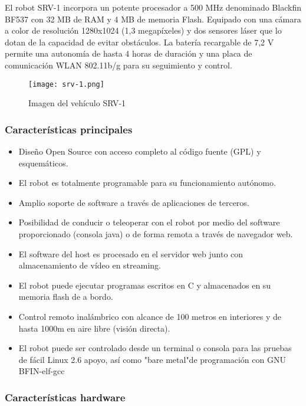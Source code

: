 El robot SRV-1 incorpora un potente procesador a 500 MHz denominado Blackfin BF537 con 32 MB de RAM y 4 MB de memoria Flash. Equipado con una cámara a color de resolución 1280x1024 (1,3 megapíxeles) y dos sensores láser que lo dotan de la capacidad de evitar obstáculos. La batería recargable de 7,2 V permite una autonomía de hasta 4 horas de duración y una placa de comunicación WLAN 802.11b/g para su seguimiento y control. \\

\begin{figure}[H]
  \begin{center}
    \texttt{[image: srv-1.png]}
  \end{center}
  \caption{Imagen del vehículo SRV-1}
  \label{SRV-1}
\end{figure}

\subsubsection{Características principales} 

\begin{itemize}
\item Diseño Open Source con acceso completo al código fuente (GPL) y esquemáticos. 
\item El robot es totalmente programable para su funcionamiento autónomo. 
\item Amplio soporte de software a través de aplicaciones de terceros. 
\item Posibilidad de conducir o teleoperar con el robot por medio del software proporcionado (consola java) o de forma remota a través de navegador web. 
\item El software del host es procesado en el servidor web junto con almacenamiento de vídeo en streaming.
\item El robot puede ejecutar programas escritos en C y almacenados en su memoria flash de a bordo. 
\item Control remoto inalámbrico con alcance de 100 metros en interiores y de hasta 1000m en aire libre (visión directa). 
\item El robot puede ser controlado desde un terminal o consola para las pruebas de fácil Linux 2.6 apoyo, así como "bare metal"de programación con GNU BFIN-elf-gcc 
\end{itemize}

\subsubsection{Características hardware} 

